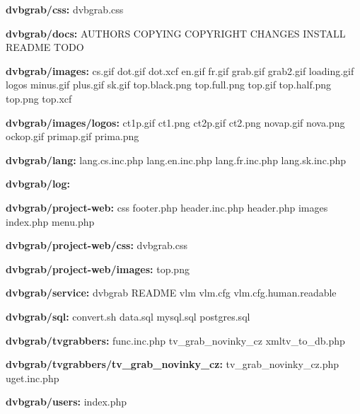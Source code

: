 \textbf{dvbgrab/css:}
dvbgrab.css

\vspace{10pt}

\textbf{dvbgrab/docs:}
AUTHORS
COPYING
COPYRIGHT
CHANGES
INSTALL
README
TODO

\vspace{10pt}

\textbf{dvbgrab/images:}
cs.gif
dot.gif
dot.xcf
en.gif
fr.gif
grab.gif
grab2.gif
loading.gif
logos
minus.gif
plus.gif
sk.gif
top.black.png
top.full.png
top.gif
top.half.png
top.png
top.xcf

\vspace{10pt}

\textbf{dvbgrab/images/logos:}
ct1p.gif
ct1.png
ct2p.gif
ct2.png
novap.gif
nova.png
ockop.gif
primap.gif
prima.png

\vspace{10pt}

\textbf{dvbgrab/lang:}
lang.cs.inc.php
lang.en.inc.php
lang.fr.inc.php
lang.sk.inc.php

\vspace{10pt}

\textbf{dvbgrab/log:}

\vspace{10pt}

\textbf{dvbgrab/project-web:}
css
footer.php
header.inc.php
header.php
images
index.php
menu.php

\vspace{10pt}

\textbf{dvbgrab/project-web/css:}
dvbgrab.css

\vspace{10pt}

\textbf{dvbgrab/project-web/images:}
top.png

\vspace{10pt}

\textbf{dvbgrab/service:}
dvbgrab
README
vlm
vlm.cfg
vlm.cfg.human.readable

\vspace{10pt}

\textbf{dvbgrab/sql:}
convert.sh
data.sql
mysql.sql
postgres.sql

\vspace{10pt}

\textbf{dvbgrab/tvgrabbers:}
func.inc.php
tv\_grab\_novinky\_cz
xmltv\_to\_db.php

\vspace{10pt}

\textbf{dvbgrab/tvgrabbers/tv\_grab\_novinky\_cz:}
tv\_grab\_novinky\_cz.php
uget.inc.php

\vspace{10pt}

\textbf{dvbgrab/users:}
index.php
